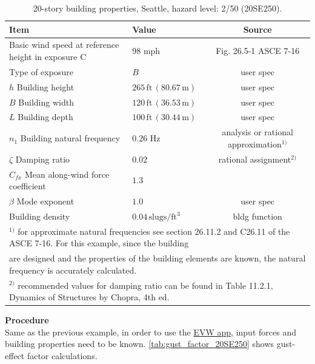 \documentclass[onecolumn, fleqn]{article}
\newcommand{\ft}{\ensuremath{\,\mathrm{ft}}}
\newcommand{\m}{\ensuremath{\,\mathrm{m}}}
\begin{document}
\begin{table}[H]
\centering \caption{20-story building properties, Seattle, hazard level: 2/50 (20SE250).}
\label{tab:prop_20SE250}
\begin{tabular}{llc}
\toprule
Item		& Value		& Source		\\
\midrule
Basic wind speed at reference height in exposure C	& 98 mph						& Fig. 26.5-1 ASCE 7-16		\\
Type of exposure									& $B$							& user spec					\\
$h$ Building height									& $265\ft \,(80.67\m)$			& user spec					\\
$B$ Building width									& $120\ft \,(36.53\m)$			& user spec					\\
$L$ Building depth									& $100\ft \,(30.44\m)$			& user spec					\\
$n_1$ Building natural frequency					& $0.26$ Hz						& analysis or rational approximation$^{1)}$\\
$\zeta$ Damping ratio								& $0.02$						& rational assignment$^{2)}$		\\
$C_{fx}$ Mean along-wind force coefficient			& $1.3$							& 							\\
$\beta$ Mode exponent								& $1.0$							& user spec					\\
Building density									& $0.04 \,\mathrm{slugs/ft^3}$	& bldg function				\\
\bottomrule
\multicolumn{3}{l}{\footnotesize $^{1)}$ for approximate natural frequencies see section 26.11.2 and C26.11 of the ASCE 7-16. For this example, since the building}	\\
\multicolumn{3}{l}{\footnotesize \hspace{3mm} are designed and the properties of the building elements are known, the natural frequency is accurately calculated.}	\\
\multicolumn{3}{l}{\footnotesize $^{2)}$ recommended values for damping ratio can be found in Table 11.2.1, Dynamics of Structures by
Chopra, 4th ed. \citep{ChopraAnilK2012Dos}}
\end{tabular}
\end{table}

\noindent\textbf{Procedure}\\
\indent Same as the previous example, in order to use the \href{https://simcenter.designsafe-ci.org/learning-tools/evw-application/}{EVW app}, input forces and building properties need to be known. \cref{tab:gust_factor_20SE250} shows gust-effect factor calculations.
\end{document}
